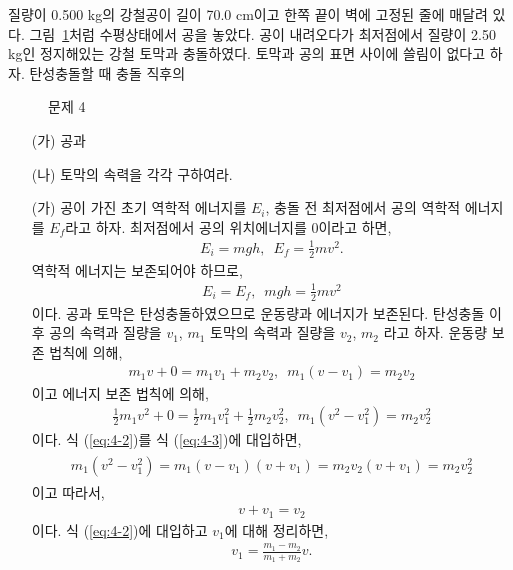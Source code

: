 \documentclass[floatfix,nofootinbib,superscriptaddress,fleqn]{revtex4-2}
\begin{document}
질량이 0.500 kg의 강철공이 길이 70.0 cm이고 한쪽 끝이 벽에 고정된 줄에
매달려 있다. 그림~\ref{fig:4}처럼 수평상태에서 공을 놓았다. 공이
내려오다가 최저점에서 질량이 2.50 kg인 정지해있는 강철 토막과
충돌하였다. 토막과 공의 표면 사이에 쓸림이 없다고 하자. 
탄성충돌할 때 충돌 직후의 
\begin{figure}[ht]
  \centering
  \caption{문제 4}
  \label{fig:4}
\end{figure}
\begin{itemize}
\item[(가)] 공과 
\item[(나)] 토막의 속력을 각각 구하여라. 
\end{itemize}
\begin{itemize}
  \item[(가)] 공이 가진 초기 역학적 에너지를 $E_i$, 충돌 전 최저점에서 
공의 역학적 에너지를 $E_f$라고 하자. 최저점에서 공의 위치에너지를 0이라고 하면,
\begin{align}
  E_i = mgh,\,\,\, E_f=\frac{1}{2}mv^2.
\end{align}
역학적 에너지는 보존되어야 하므로,
\begin{align}\label{eq:4-1}
  E_i = E_f,\,\,\, mgh=\frac{1}{2}mv^2
\end{align}
이다. 공과 토막은 탄성충돌하였으므로 운동량과 에너지가 보존된다. 
탄성충돌 이후 공의 속력과 질량을 $v_1$, $m_1$ 토막의 속력과 질량을 $v_2$, $m_2$ 라고 
하자. 운동량 보존 법칙에 의해,
\begin{align}\label{eq:4-2}
  m_1v+0 = m_1v_1+m_2v_2,\,\,\,m_1(v-v_1)=m_2v_2
\end{align}
이고 에너지 보존 법칙에 의해,
\begin{align}\label{eq:4-3}
  \frac{1}{2}m_1v^2+0 = \frac{1}{2}m_1v_1^2+\frac{1}{2}m_2v_2^2
  ,\,\,\,  m_1(v^2-v_1^2) =m_2v_2^2
\end{align}
이다. 식 (\ref{eq:4-2})를 식 (\ref{eq:4-3})에 대입하면,
\begin{align}
  \begin{split}
    m_1(v^2-v^2_1)=m_1(v-v_1)(v+v_1)=m_2v_2(v+v_1)=m_2v_2^2
  \end{split}
\end{align}
이고 따라서,
\begin{align}\label{eq:4-4}
  v+v_1 = v_2
\end{align}
이다. 식 (\ref{eq:4-2})에 대입하고 $v_1$에 대해 정리하면,
\begin{align}
  v_1 = \frac{m_1-m_2}{m_1+m_2}v.

\end{align}
\end{itemize}
\end{document}

